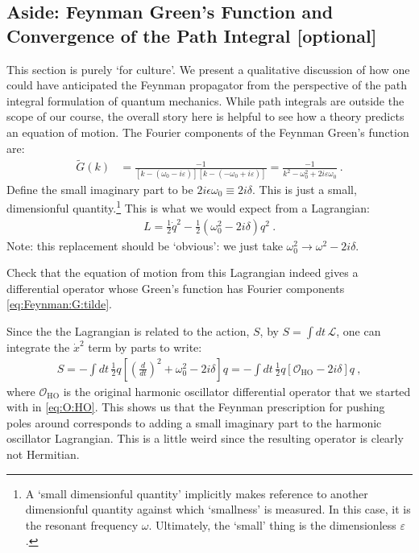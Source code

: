 \subsection{Aside: Feynman Green's Function and Convergence of the Path Integral [optional]}

This section is purely `for culture'. We present a qualitative discussion of how one could have anticipated the Feynman propagator from the perspective of the path integral formulation of quantum mechanics. While path integrals are outside the scope of our course, the overall story here is helpful to see how a theory predicts an equation of motion. The Fourier components of the Feynman Green's function are:
\begin{align}
	\tilde G(k) &=
	\frac{-1}{
	\left[k-(\omega_0 -i\varepsilon)\right]
	\left[k-(-\omega_0 + i\varepsilon)\right]
	}
	=
	\frac{-1}{
	k^2 - \omega_0^2 + 2i\varepsilon \omega_0
	}
	\ .
	\label{eq:Feynman:G:tilde}
\end{align}
Define the small imaginary part to be $2i\epsilon \omega_0 \equiv 2i\delta$. This is just a small, dimensionful quantity.\footnote{A `small dimensionful quantity' implicitly makes reference to another dimensionful quantity against which `smallness' is measured. In this case, it is the resonant frequency $\omega$. Ultimately, the `small' thing is the dimensionless $\varepsilon$.}  This is what we would expect from a Lagrangian:
\begin{align}
	L = \frac{1}{2}\dot q^2 - \frac{1}{2}\left(\omega_0^2 - 2i \delta\right)q^2 \ .
\end{align}
Note: this replacement should be `obvious': we just take $\omega_0^2 \to \omega^2 - 2i\delta$.
\begin{exercise}
Check that the equation of motion from this Lagrangian indeed gives a differential operator whose Green's function has Fourier components \eqref{eq:Feynman:G:tilde}.
\end{exercise}
Since the the Lagrangian is related to the action, $S$, by $S=\int dt\, \mathcal L$, one can integrate the $\dot x^2$ term by parts to write:
\begin{align}
	S = -\int dt \, \frac{1}{2}
	q 
	\left[\left(\frac{d}{dt}\right)^2 + \omega_0^2 - 2i\delta \right]
	q 
	=
	-\int dt \, \frac{1}{2}
	q 
	\left[\mathcal O_\text{HO} - 2i\delta \right]
	q  \ ,
	\label{eq:HO:S:Feynman:quad}
\end{align}
where $\mathcal O_\text{HO}$ is the original harmonic oscillator differential operator that we started with in \eqref{eq:O:HO}. This shows us that the Feynman prescription for pushing poles around corresponds to adding a small imaginary part to the harmonic oscillator Lagrangian. This is a little weird since the resulting operator is clearly not Hermitian.

